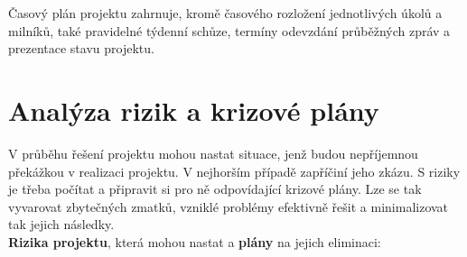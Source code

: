 \documentclass[12pt,a4paper]{article}
\begin{document}
Časový plán projektu zahrnuje, kromě časového rozložení jednotlivých úkolů a milníků, také pravidelné týdenní schůze, termíny odevzdání průběžných zpráv a prezentace stavu projektu.


\section*{Analýza rizik a krizové plány}
V průběhu řešení projektu mohou nastat situace, jenž budou nepříjemnou překážkou v realizaci projektu. V nejhorším případě zapříčiní jeho zkázu. S riziky je třeba počítat a připravit si pro ně odpovídající krizové plány. Lze se tak vyvarovat zbytečných zmatků, vzniklé problémy efektivně řešit a minimalizovat tak jejich následky. \\

\noindent \textbf{Rizika projektu}, která mohou nastat a \textbf{plány} na jejich eliminaci: 
\end{document}
